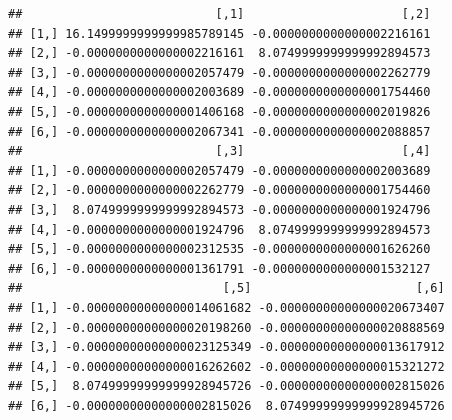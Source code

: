 \documentclass[]{article}
\begin{document}
\begin{verbatim}
##                           [,1]                      [,2]
## [1,] 16.1499999999999985789145 -0.0000000000000002216161
## [2,] -0.0000000000000002216161  8.0749999999999992894573
## [3,] -0.0000000000000002057479 -0.0000000000000002262779
## [4,] -0.0000000000000002003689 -0.0000000000000001754460
## [5,] -0.0000000000000001406168 -0.0000000000000002019826
## [6,] -0.0000000000000002067341 -0.0000000000000002088857
##                           [,3]                      [,4]
## [1,] -0.0000000000000002057479 -0.0000000000000002003689
## [2,] -0.0000000000000002262779 -0.0000000000000001754460
## [3,]  8.0749999999999992894573 -0.0000000000000001924796
## [4,] -0.0000000000000001924796  8.0749999999999992894573
## [5,] -0.0000000000000002312535 -0.0000000000000001626260
## [6,] -0.0000000000000001361791 -0.0000000000000001532127
##                            [,5]                       [,6]
## [1,] -0.00000000000000014061682 -0.00000000000000020673407
## [2,] -0.00000000000000020198260 -0.00000000000000020888569
## [3,] -0.00000000000000023125349 -0.00000000000000013617912
## [4,] -0.00000000000000016262602 -0.00000000000000015321272
## [5,]  8.07499999999999928945726 -0.00000000000000002815026
## [6,] -0.00000000000000002815026  8.07499999999999928945726
\end{verbatim}
\end{document}

